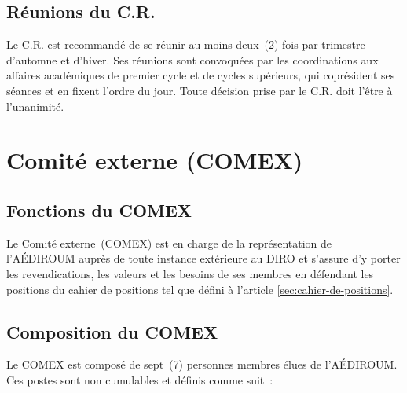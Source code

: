 \documentclass{aediroum}
\newcommand{\article}[1]{article \ref{#1}}
\begin{document}
\subsection{Réunions du C.R.}

Le C.R. est recommandé de se réunir au moins deux~(2) fois par trimestre d’automne et d’hiver.
Ses réunions sont convoquées par les coordinations aux affaires académiques de premier cycle et de cycles supérieurs, qui coprésident ses séances et en fixent l’ordre du jour.
Toute décision prise par le C.R. doit l’être à l’unanimité.

\section{Comité externe (COMEX)}

\subsection{Fonctions du COMEX}

Le Comité externe~(COMEX) est en charge de la représentation de l’AÉDIROUM auprès de toute instance extérieure au DIRO et s’assure d’y porter les revendications, les valeurs et les besoins de ses membres en défendant les positions du cahier de positions tel que défini à l'\article{sec:cahier-de-positions}.

\subsection{Composition du COMEX}\label{sec:comex-composition}

Le COMEX est composé de sept~(7) personnes membres élues de l’AÉDIROUM.
Ces postes sont non cumulables et définis comme suit~:
\end{document}
